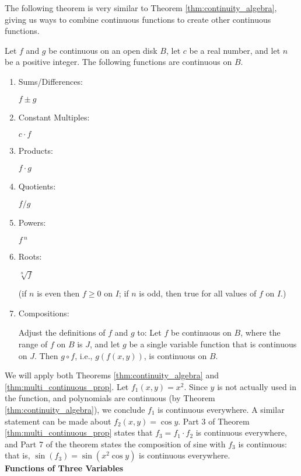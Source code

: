 The following theorem is very similar to Theorem \ref{thm:continuity_algebra}, giving us ways to combine continuous functions to create other continuous functions.

{Let $f$ and $g$ be continuous on an open disk $B$, let $c$ be a real number, and let $n$ be a positive integer. The following functions are continuous on $B$.
		\begin{enumerate}
		\item		\parbox{80pt}{Sums/Differences:}	$f\pm g$
		\item		\parbox{80pt}{Constant Multiples:}	$c\cdot f$
		\item		\parbox{80pt}{Products:}	$f\cdot g$
		\item		\parbox{80pt}{Quotients:}	$f/g$ 
		\item		\parbox{80pt}{Powers:}	$f\,^n$
		\item		\parbox{80pt}{Roots:}	$\sqrt[n]{f}$ \qquad \parbox[t]{150pt}{\small (if $n$ is even then $f\geq 0$ on $I$; if $n$ is odd, then true for all values of $f$ on $I$.)}
		\item		\parbox{80pt}{Compositions:}\parbox[t]{185pt}{Adjust the definitions of $f$ and $g$ to: Let $f$ be continuous on $B$, where the range of $f$ on $B$ is $J$, and let $g$ be a single variable function that is continuous on $J$. Then $g\circ f$, i.e., $g(f(x,y))$, is continuous on $B$.}
		\end{enumerate}
}
\enlargethispage{\baselineskip}

{We will apply both Theorems \ref{thm:continuity_algebra} and \ref{thm:multi_continuous_prop}. Let $f_1(x,y) = x^2$. Since $y$ is not actually used in the function, and polynomials are continuous (by Theorem \ref{thm:continuity_algebra}), we conclude $f_1$ is continuous everywhere. A similar statement can be made about $f_2(x,y) = \cos y$. Part 3 of Theorem \ref{thm:multi_continuous_prop} states that $f_3=f_1\cdot f_2$ is continuous everywhere, and Part 7 of the theorem states the composition of sine with $f_3$ is continuous: that is, $\sin (f_3) = \sin(x^2\cos y)$ is continuous everywhere.
}\\

\noindent\textbf{\large Functions of Three Variables}\\

